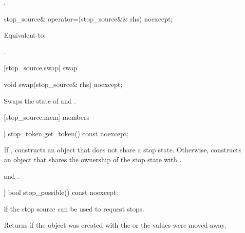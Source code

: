 {\begin{itemdescr}
  \pnum\returns {}.
\end{itemdescr}

%
\begin{itemdecl}
stop_source& operator=(stop_source&& rhs) noexcept;
\end{itemdecl}
\begin{itemdescr}
  \pnum\effects Equivalent to: 

  \pnum\returns {}.
\end{itemdescr}

[stop_source.swap]{ swap}

%
\begin{itemdecl}
void swap(stop_source& rhs) noexcept;
\end{itemdecl}

\begin{itemdescr}
 \pnum \effects Swaps the state of  and .
\end{itemdescr}


[stop_source.mem]{ members}

%
\begin{itemdecl}
[[nodiscard]] stop_token get_token() const noexcept;
\end{itemdecl}
\begin{itemdescr}
  \pnum\effects If , constructs an  object
                that does not share a stop state.
                Otherwise, constructs an  object 
                that shares the ownership of the stop state with .

  \pnum\postconditions {}
                and .
\end{itemdescr}


%
\begin{itemdecl}
[[nodiscard]] bool stop_possible() const noexcept;
\end{itemdecl}
\begin{itemdescr}
  \pnum\returns {} if the stop source can be used to request stops.
                \begin{note} Returns  if the object was created with the 
                             or the values were moved away.
                             \end{note}
\end{itemdescr}

}
